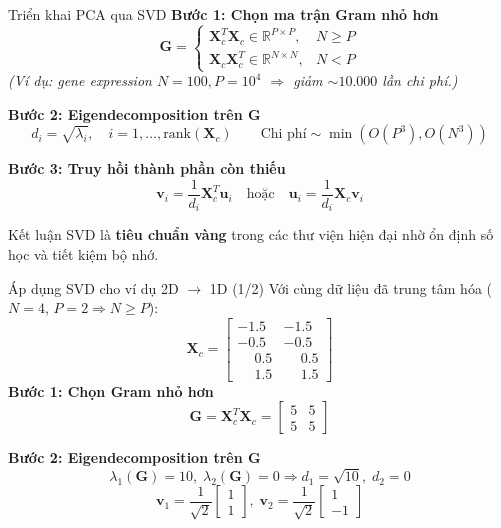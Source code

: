 \begin{frame}{Triển khai PCA qua SVD}
	\small
	\textbf{Bước 1: Chọn ma trận Gram nhỏ hơn}
	\[
		\mathbf{G}=
		\begin{cases}
			\mathbf{X}_c^T\mathbf{X}_c\in\mathbb{R}^{P\times P}, & N\ge P\\
			\mathbf{X}_c\mathbf{X}_c^T\in\mathbb{R}^{N\times N}, & N<P
		\end{cases}
	\]
	{\small \textit{(Ví dụ: gene expression $N=100, P=10^4$ $\Rightarrow$ giảm $\sim 10{.}000$ lần chi phí.)}}

	\textbf{Bước 2: Eigendecomposition trên $\mathbf{G}$}
	\[
		d_i=\sqrt{\lambda_i},\quad i=1,\dots,\mathrm{rank}(\mathbf{X}_c)
		\qquad\text{Chi phí}\sim\min\!\left(O(P^3),O(N^3)\right)
	\]

	\textbf{Bước 3: Truy hồi thành phần còn thiếu}
	\[
		\mathbf{v}_i=\frac{1}{d_i}\mathbf{X}_c^T\mathbf{u}_i
		\quad\text{hoặc}\quad
		\mathbf{u}_i=\frac{1}{d_i}\mathbf{X}_c\mathbf{v}_i
	\]

	\begin{block}{Kết luận}
		SVD là \textbf{tiêu chuẩn vàng} trong các thư viện hiện đại nhờ ổn định số học và tiết kiệm bộ nhớ.
	\end{block}
\end{frame}

\begin{frame}{Áp dụng SVD cho ví dụ 2D $\to$ 1D (1/2)}
	\scriptsize
	\setlength{\abovedisplayskip}{0.2em}
	\setlength{\belowdisplayskip}{0.2em}
	\setlength{\abovedisplayshortskip}{0.15em}
	\setlength{\belowdisplayshortskip}{0.15em}
	\setlength{\columnsep}{0.6em}
	Với cùng dữ liệu đã trung tâm hóa ($N=4,\,P=2\Rightarrow N\ge P$):
	\[
		\mathbf{X}_c=
		\begin{bmatrix}
			-1.5 & -1.5\\
			-0.5 & -0.5\\
			\phantom{-}0.5 & \phantom{-}0.5\\
			\phantom{-}1.5 & \phantom{-}1.5
		\end{bmatrix}
	\]
\textbf{Bước 1: Chọn Gram nhỏ hơn}
\[
	\mathbf{G}=\mathbf{X}_c^T\mathbf{X}_c=
	\begin{bmatrix}5 & 5\\ 5 & 5\end{bmatrix}
\]

\textbf{Bước 2: Eigendecomposition trên $\mathbf{G}$}
\[
	\lambda_1(\mathbf{G})=10,\;\lambda_2(\mathbf{G})=0
	\Rightarrow
	d_1=\sqrt{10},\;d_2=0
\]
\[
	\mathbf{v}_1=\frac{1}{\sqrt{2}}\begin{bmatrix}1\\1\end{bmatrix},\;
	\mathbf{v}_2=\frac{1}{\sqrt{2}}\begin{bmatrix}1\\-1\end{bmatrix}
\]
\end{frame}

